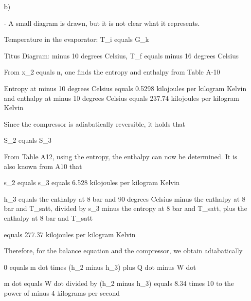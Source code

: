 b)

- A small diagram is drawn, but it is not clear what it represents.

Temperature in the evaporator: T_i equals G_k

Titus Diagram: minus 10 degrees Celsius, T_f equals minus 16 degrees Celsius

From x_2 equals n, one finds the entropy and enthalpy from Table A-10

Entropy at minus 10 degrees Celsius equals 0.5298 kilojoules per kilogram Kelvin and enthalpy at minus 10 degrees Celsius equals 237.74 kilojoules per kilogram Kelvin

Since the compressor is adiabatically reversible, it holds that

S_2 equals S_3

From Table A12, using the entropy, the enthalpy can now be determined. It is also known from A10 that

s_2 equals s_3 equals 6.528 kilojoules per kilogram Kelvin

h_3 equals the enthalpy at 8 bar and 90 degrees Celsius minus the enthalpy at 8 bar and T_satt, divided by s_3 minus the entropy at 8 bar and T_satt, plus the enthalpy at 8 bar and T_satt

equals 277.37 kilojoules per kilogram Kelvin

Therefore, for the balance equation and the compressor, we obtain adiabatically

0 equals m dot times (h_2 minus h_3) plus Q dot minus W dot

m dot equals W dot divided by (h_2 minus h_3) equals 8.34 times 10 to the power of minus 4 kilograms per second